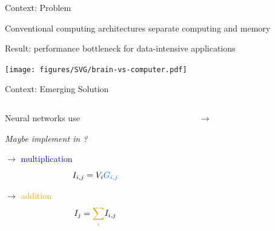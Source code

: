 \documentclass[
  aspectratio=169,
  hyperref={breaklinks=true, colorlinks, citecolor=blue, linkcolor=blue, urlcolor=blue},
]{beamer}
\begin{document}
\begin{frame}{Context: Problem}
  \pause{}

  Conventional computing architectures \alert{separate} computing and memory

  \pause{}
  \bigskip

  Result: \alert{performance bottleneck} for data-intensive applications

  \pause{}
  \bigskip

  \centering
  \texttt{[image: figures/SVG/brain-vs-computer.pdf]}

\end{frame}

\begin{frame}{Context: Emerging Solution}
  \begin{columns}
    \begin{column}{0.45\linewidth}
      \pause{}
      \bigskip

      Neural networks use 

      \pause{}
      \bigskip

      \emph{Maybe implement in ?}

      \pause{}
      \bigskip
      \bigskip

       $\rightarrow$ \textcolor{blue}{multiplication}
      \[I_{i, j} = V_i \textcolor{blue}{G_{i, j}}\]

      \pause{}
      \bigskip

       $\rightarrow$ \textcolor{orange}{addition}
      \[I_j = \textcolor{orange}{\sum_i} I_{i, j}\]

    \end{column}

    \pause{}
    \bigskip

    \begin{column}{0.55\linewidth}
       $\rightarrow$ 

      \bigskip

    \end{column}
  \end{columns}
\end{frame}
\end{document}
